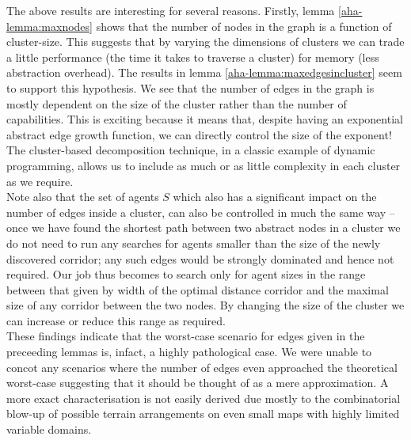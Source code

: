 The above results are interesting for several reasons. 
Firstly, lemma \ref{aha-lemma:maxnodes} shows that the number of nodes in the graph is a function of cluster-size. This suggests that by varying the dimensions of clusters we can trade a little performance (the time it takes to traverse a cluster) for memory (less abstraction overhead).
The results in lemma \ref{aha-lemma:maxedgesincluster} seem to support this hypothesis. We see that the number of edges in the graph is mostly dependent on the size of the cluster rather than the number of capabilities. 
This is exciting because it means that, despite having an exponential abstract edge growth function, we can directly control the size of the exponent! The cluster-based decomposition technique, in a classic example of dynamic programming, allows us to include as much or as little complexity in each cluster as we require.\\ \newline
Note also that the set of agents $S$ which also has a significant impact on the number of edges inside a cluster, can also be controlled in much the same way -- once we have found the shortest path between two abstract nodes in a cluster we do not need to run any searches for agents smaller than the size of the newly discovered corridor; any such edges would be strongly dominated and hence not required. Our job thus becomes to search only for agent sizes in the range between that given by width of the optimal distance corridor and the maximal size of any corridor between the two nodes. By changing the size of the cluster we can increase or reduce this range as required.\\ 
These findings indicate that the worst-case scenario for edges given in the preceeding lemmas is, infact, a highly pathological case. We were unable to concot any scenarios where the number of edges even approached the theoretical worst-case suggesting that it should be thought of as a mere approximation. A more exact characterisation is not easily derived due mostly to the combinatorial blow-up of possible terrain arrangements on even small maps with highly limited variable domains.
